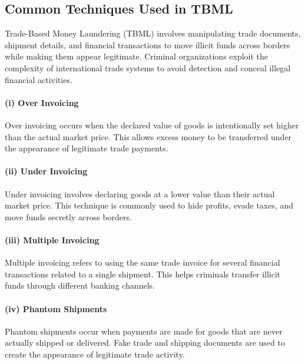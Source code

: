 
\subsection[Common Techniques Used in TBML]{\textbf{Common Techniques Used in TBML}}

Trade-Based Money Laundering (TBML) involves manipulating trade documents, shipment details, and financial transactions to move illicit funds across borders while making them appear legitimate. Criminal organizations exploit the complexity of international trade systems to avoid detection and conceal illegal financial activities.

\paragraph{\textbf{(i) Over Invoicing}}
Over invoicing occurs when the declared value of goods is intentionally set higher than the actual market price. This allows excess money to be transferred under the appearance of legitimate trade payments.

\paragraph{\textbf{(ii) Under Invoicing}}
Under invoicing involves declaring goods at a lower value than their actual market price. This technique is commonly used to hide profits, evade taxes, and move funds secretly across borders.

\paragraph{\textbf{(iii) Multiple Invoicing}}
Multiple invoicing refers to using the same trade invoice for several financial transactions related to a single shipment. This helps criminals transfer illicit funds through different banking channels.

\paragraph{\textbf{(iv) Phantom Shipments}}
Phantom shipments occur when payments are made for goods that are never actually shipped or delivered. Fake trade and shipping documents are used to create the appearance of legitimate trade activity.

